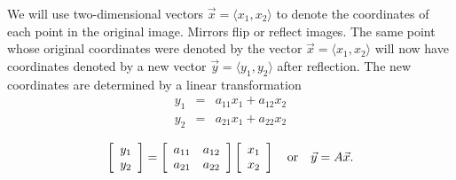 \documentclass{ximera}
\begin{document}
We will use two-dimensional vectors $\vec x = \langle{x_1, x_2}\rangle$ to denote the coordinates of each point in the original image.  Mirrors flip or reflect images.  The same point whose original coordinates were denoted by the vector $\vec x = \langle{x_1, x_2}\rangle$ will now have coordinates denoted by a new vector $\vec y = \langle{y_1, y_2}\rangle$ after reflection.  
The new coordinates are determined by a linear transformation
\begin{eqnarray*}
y_1 &=& a_{11} x_1 + a_{12} x_2\\
y_2 &=& a_{21} x_1 + a_{22} x_2
\end{eqnarray*}

$$\left[{\begin{array}{c} y_1 \\ y_2 \\ \end{array}}\right] = \left[{\begin{array}{cc} a_{11} & a_{12} \\ a_{21} & a_{22} \\ \end{array}}\right] \left[{\begin{array}{c} x_1 \\ x_2 \\ \end{array}}\right]
\quad {\rm or} \quad \vec y = A \vec x.$$
\end{document}
